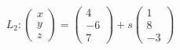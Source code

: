 \documentclass[preview]{standalone}
\begin{document}
\begin{align*}
L_2:\begin{pmatrix}x\\y\\z\end{pmatrix}=\begin{pmatrix}4\\-6\\7\end{pmatrix}+s\begin{pmatrix}1\\8\\-3\end{pmatrix}
\end{align*}
\end{document}
